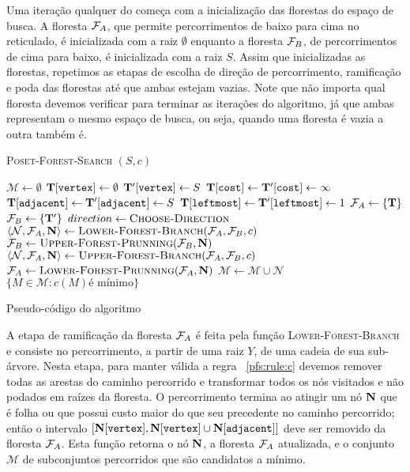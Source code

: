 Uma iteração qualquer do  começa com a inicialização das 
florestas do espaço de busca. A floresta $\mathcal{F}_A$, que permite 
percorrimentos de baixo para cima no reticulado, é inicializada com 
a raiz $\emptyset$ enquanto a floresta $\mathcal{F}_B$, de percorrimentos
de cima para baixo, é inicializada com a raiz $S$. Assim que 
inicializadas as florestas, repetimos as etapas de escolha de direção
de percorrimento, ramificação e poda das florestas até que ambas 
estejam vazias. Note que não importa qual floresta devemos verificar
para terminar as iterações do algoritmo, já que ambas representam o 
mesmo espaço de busca, ou seja, quando uma floresta é vazia a outra 
também é.

\begin{algorithm}[H]
\textsc{Poset-Forest-Search} $(S, c)$
\begin{algorithmic}[1]
    \State $\mathcal{M} \gets \emptyset$
    \State $\mathbf T[\texttt{vertex}] \gets \emptyset$
    \State $\mathbf T'[\texttt{vertex}] \gets S$
    \State $\mathbf T[\texttt{cost}] \gets \mathbf T'[\texttt{cost}] \gets \infty$
    \State $\mathbf T[\texttt{adjacent}] \gets \mathbf T'[\texttt{adjacent}] \gets S$
    \State $\mathbf T[\texttt{leftmost}] \gets \mathbf T'[\texttt{leftmost}] \gets 1$
    \State $\mathcal{F}_A \gets \{\mathbf T\}$
    \State $\mathcal{F}_B \gets \{\mathbf T'\}$
     
        \State $direction \gets {\normalfont\textsc{Choose-Direction}}$
            \State $\langle \mathcal{N}, \mathcal{F}_A, \mathbf N \rangle \gets {\normalfont\textsc{Lower-Forest-Branch}} (\mathcal{F}_A, \mathcal{F}_B, c)$
            \State $\mathcal{F}_B \gets {\normalfont\textsc{Upper-Forest-Prunning}} (\mathcal{F}_B, \mathbf N)$
        \Else
            \State $\langle \mathcal{N}, \mathcal{F}_A, \mathbf N \rangle \gets {\normalfont\textsc{Upper-Forest-Branch}} (\mathcal{F}_A, \mathcal{F}_B, c)$
            \State $\mathcal{F}_A \gets {\normalfont\textsc{Lower-Forest-Prunning}} (\mathcal{F}_A, \mathbf N)$
        \EndIf
        \State $\mathcal{M} \gets \mathcal{M} \cup \mathcal{N}$
    \EndWhile
    \Return $\{M \in \mathcal{M} : c(M) \text{é mínimo}\}$
\end{algorithmic}
\vspace{1em}
\caption{Pseudo-código do algoritmo }
\label{pfs:code:pfs:A}
\end{algorithm}

\newpage
A etapa de ramificação da floresta $\mathcal{F}_A$ é feita pela função 
\textsc{Lower-Forest-Branch} e consiste no percorrimento, a partir de uma 
raiz $Y$, de uma cadeia de sua sub-árvore. Nesta etapa, para manter 
válida a regra ~\ref{pfs:rule:c} devemos remover todas as arestas do 
caminho percorrido e transformar todos os nós visitados e não podados em 
raízes da floresta. O percorrimento termina ao atingir um nó 
$\mathbf N$ que é folha ou que possui custo maior do que seu 
precedente no caminho percorrido; então o intervalo 
$[\mathbf N[\texttt{vertex}], \mathbf N[\texttt{vertex}] \cup \mathbf N[\texttt{adjacent}]]$
deve ser removido da floresta $\mathcal{F}_A$. Esta função retorna o nó 
$\mathbf N$, a floresta $\mathcal{F}_A$ atualizada, e o conjunto 
$\mathcal{M}$ de subconjuntos percorridos que são candidatos a mínimo.


